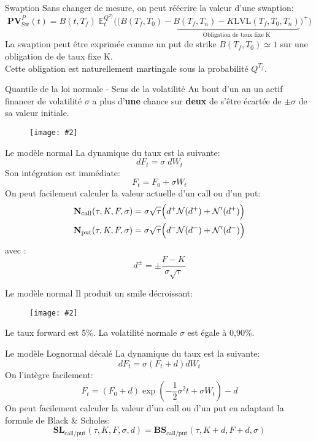 \documentclass{beamer}
\newcommand{\FIG}[2]{\texttt{[image: \#2]}}
\begin{document}
\begin{frame}{Swaption}
Sans changer de mesure, on peut réécrire la valeur d'une swaption:
\[
\textbf{PV}_\text{Sw}^P(t)=B(t,T_f)\;\mathbb{E}_t^{Q^{T_f}}\Big(\big(B(T_f,T_0)-\underbrace{B(T_f,T_n)-K\text{LVL}(T_f,T_0,T_n)}_{\text{Obligation de taux fixe K}}\big)^+\Big)
\]
La swaption peut être exprimée comme un put de strike $B(T_f,T_0)\simeq1$ sur une obligation de de taux fixe K.\\
\vspace{0.5cm}
Cette obligation est naturellement martingale sous la probabilité $Q^{T_f}$.
\end{frame}

\begin{frame}{Quantile de la loi normale - Sens de la volatilité}
Au bout d'un an un actif financer de volatilité $\sigma$ a plus d'\textbf{une} chance sur \textbf{deux} de s'être écartée de $\pm \sigma$ de sa valeur initiale.
\begin{center}
\begin{figure}[h]
\FIG{11cm}{figures/loinormale_quantile.png}
\end{figure}
\end{center}
\end{frame}

\begin{frame}{Le modèle normal}
La dynamique du taux est la suivante:
\[
dF_t=\sigma\; dW_t
\]
Son intégration est immédiate:
\[
F_t = F_0 + \sigma W_t
\]
On peut facilement calculer la valeur actuelle d'un call ou d'un put:
\[
\begin{split}
&\text{\textbf{N}}_\text{call}(\tau,K,F,\sigma)=\sigma\sqrt{\tau}\Big(d^+\mathcal{N}(d^+)+\mathcal{N}'(d^+)\Big)\\
&\text{\textbf{N}}_\text{put}(\tau,K,F,\sigma)=\sigma\sqrt{\tau}\Big(d^-\mathcal{N}(d^-)+\mathcal{N}'(d^-)\Big)\\
\end{split}
\]
avec :
\[
d^\pm = \pm \frac{F-K}{\sigma\sqrt{\tau}}
\]
\end{frame}

\begin{frame}{Le modèle normal}
Il produit un smile décroissant:
\begin{figure}[h]
\FIG{8cm}{figures/smile_normal.jpg}
\end{figure}
Le taux forward est 5\%. La volatilité normale $\sigma$ est égale à 0,90\%. 
\end{frame}

\begin{frame}{Le modèle Lognormal décalé}
La dynamique du taux est la suivante:
\[
dF_t=\sigma (F_t + d)dW_t
\]
On l'intègre facilement:
\[
F_t = (F_0+d)\exp\left(-\frac{1}{2}\sigma^2t+\sigma W_{t} \right)-d
\]
On peut facilement calculer la valeur d'un call ou d'un put en adaptant la formule de Black \& Scholes:
\[
\mathbf{SL}_\text{call/put}(\tau,K,F,\sigma,d)=\mathbf{BS}_\text{call/put}(\tau,K+d,F+d,\sigma)
\]
\end{frame}
\end{document}
